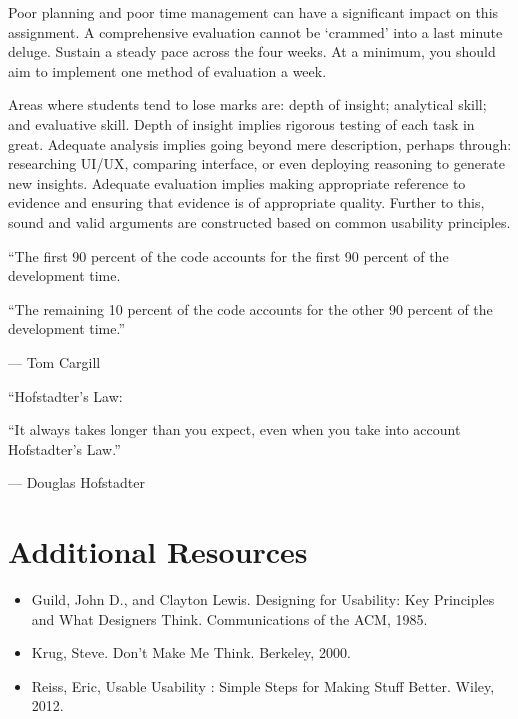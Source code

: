 \documentclass{../fal_assignment}
\begin{document}
Poor planning and poor time management can have a significant impact on this assignment. A comprehensive evaluation cannot be `crammed' into a last minute deluge. Sustain a steady pace across the four weeks. At a minimum, you should aim to implement one method of evaluation a week.

Areas where students tend to lose marks are: depth of insight; analytical skill; and evaluative skill. Depth of insight implies rigorous testing of each task in great. Adequate analysis implies going beyond mere description, perhaps through: researching UI/UX, comparing interface, or even deploying reasoning to generate new insights. Adequate evaluation implies making appropriate reference to evidence and ensuring that evidence is of appropriate quality. Further to this, sound and valid arguments are constructed based on common usability principles. 

\begin{marginquote}
    ``The first 90 percent of the code accounts for the first 90 percent of the development time.
    
    ``The remaining 10 percent of the code accounts for the other 90 percent of the development time.''
    
    --- Tom Cargill
    
    \marginquoterule
    
    ``Hofstadter's Law:
    
    ``It always takes longer than you expect, even when you take into account Hofstadter's Law.''
    
    --- Douglas Hofstadter
\end{marginquote}

\section*{Additional Resources}
\begin{itemize}
    \item Guild, John D., and Clayton Lewis. Designing for Usability: Key Principles and What Designers Think. Communications of the ACM, 1985.
    \item Krug, Steve. Don't Make Me Think. Berkeley, 2000. 
    \item Reiss, Eric, Usable Usability : Simple Steps for Making Stuff Better. Wiley, 2012.
\end{itemize}

\rubricyeartwo
\end{document}
